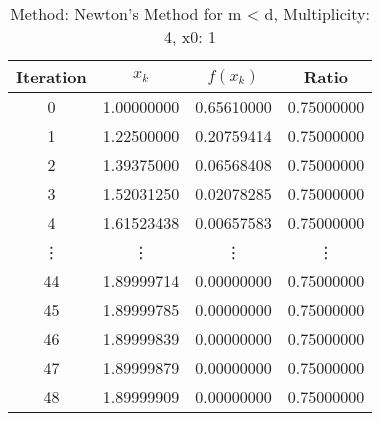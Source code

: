 \begin{table}
\centering
\caption{Method: Newton's Method for m < d, Multiplicity: 4, x0: 1}
\label{tab:table_Newton's_Method_for_m_<_d_4_1}
\begin{tabular}{c c c c}
\toprule
Iteration &      $x_k$ &   $f(x_k)$ &      Ratio \\
\midrule
        0 & 1.00000000 & 0.65610000 & 0.75000000 \\
        1 & 1.22500000 & 0.20759414 & 0.75000000 \\
        2 & 1.39375000 & 0.06568408 & 0.75000000 \\
        3 & 1.52031250 & 0.02078285 & 0.75000000 \\
        4 & 1.61523438 & 0.00657583 & 0.75000000 \\
   \vdots &     \vdots &     \vdots &     \vdots \\
       44 & 1.89999714 & 0.00000000 & 0.75000000 \\
       45 & 1.89999785 & 0.00000000 & 0.75000000 \\
       46 & 1.89999839 & 0.00000000 & 0.75000000 \\
       47 & 1.89999879 & 0.00000000 & 0.75000000 \\
       48 & 1.89999909 & 0.00000000 & 0.75000000 \\
\bottomrule
\end{tabular}
\end{table}
